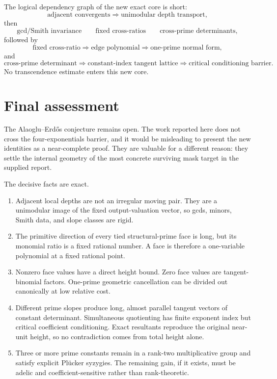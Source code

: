 \documentclass[11pt,oneside]{article}
\theoremstyle{definition}
\theoremstyle{remark}
\newcommand{\AEname}{Alaoglu--Erd\H{o}s}
\begin{document}
The logical dependency graph of the new exact core is short:
\[
\boxed{\text{adjacent convergents}}
\Longrightarrow
\boxed{\text{unimodular depth transport}},
\]
then
\[
\boxed{\text{gcd/Smith invariance}}
\qquad
\boxed{\text{fixed cross-ratios}}
\qquad
\boxed{\text{cross-prime determinants}},
\]
followed by
\[
\boxed{\text{fixed cross-ratio}}
\Longrightarrow
\boxed{\text{edge polynomial}}
\Longrightarrow
\boxed{\text{one-prime normal form}},
\]
and
\[
\boxed{\text{cross-prime determinant}}
\Longrightarrow
\boxed{\text{constant-index tangent lattice}}
\Longrightarrow
\boxed{\text{critical conditioning barrier}}.
\]
No transcendence estimate enters this new core.

\section{Final assessment}
\label{sec:conclusion}

The \AEname{} conjecture remains open.  The work reported here does not cross the
four-exponentials barrier, and it would be misleading to present the new identities as a
near-complete proof.  They are valuable for a different reason: they settle the internal
geometry of the most concrete surviving mask target in the supplied report.

The decisive facts are exact.

\begin{enumerate}
\item Adjacent local depths are not an irregular moving pair.  They are a unimodular image of
the fixed output-valuation vector, so gcds, minors, Smith data, and slope classes are rigid.
\item The primitive direction of every tied structural-prime face is long, but its monomial
ratio is a fixed rational number.  A face is therefore a one-variable polynomial at a fixed
rational point.
\item Nonzero face values have a direct height bound.  Zero face values are tangent-binomial
factors.  One-prime geometric cancellation can be divided out canonically at low relative
cost.
\item Different prime slopes produce long, almost parallel tangent vectors of constant
determinant.  Simultaneous quotienting has finite exponent index but critical coefficient
conditioning.  Exact resultants reproduce the original near-unit height, so no contradiction
comes from total height alone.
\item Three or more prime constants remain in a rank-two multiplicative group and satisfy
explicit Pl\"ucker syzygies.  The remaining gain, if it exists, must be adelic and
coefficient-sensitive rather than rank-theoretic.
\end{enumerate}
\end{document}
